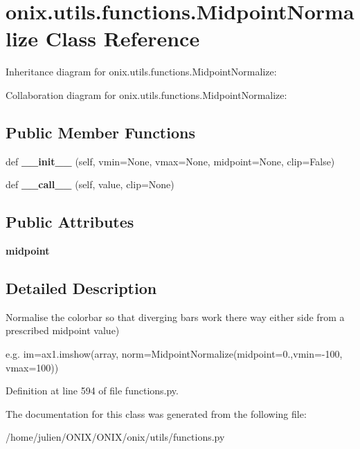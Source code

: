 \hypertarget{classonix_1_1utils_1_1functions_1_1MidpointNormalize}{}\section{onix.\+utils.\+functions.\+Midpoint\+Normalize Class Reference}
\label{classonix_1_1utils_1_1functions_1_1MidpointNormalize}


Inheritance diagram for onix.\+utils.\+functions.\+Midpoint\+Normalize\+:


Collaboration diagram for onix.\+utils.\+functions.\+Midpoint\+Normalize\+:
\subsection*{Public Member Functions}
\begin{DoxyCompactItemize}
\item 
\mbox{\label{classonix_1_1utils_1_1functions_1_1MidpointNormalize_a3a2aabe3adde734ddd54a51035d1ed73}} 
def {\bfseries \+\_\+\+\_\+init\+\_\+\+\_\+} (self, vmin=None, vmax=None, midpoint=None, clip=False)
\item 
\mbox{\label{classonix_1_1utils_1_1functions_1_1MidpointNormalize_ab3622ca6d45aebe46dd0ac8826dc38e3}} 
def {\bfseries \+\_\+\+\_\+call\+\_\+\+\_\+} (self, value, clip=None)
\end{DoxyCompactItemize}
\subsection*{Public Attributes}
\begin{DoxyCompactItemize}
\item 
\mbox{\label{classonix_1_1utils_1_1functions_1_1MidpointNormalize_a63b5eba335b4bb1a311c211a6a9dba4d}} 
{\bfseries midpoint}
\end{DoxyCompactItemize}


\subsection{Detailed Description}
\begin{DoxyVerb}Normalise the colorbar so that diverging bars work there way either side from a prescribed midpoint value)

e.g. im=ax1.imshow(array, norm=MidpointNormalize(midpoint=0.,vmin=-100, vmax=100))
\end{DoxyVerb}
 

Definition at line 594 of file functions.\+py.



The documentation for this class was generated from the following file\+:\begin{DoxyCompactItemize}
\item 
/home/julien/\+O\+N\+I\+X/\+O\+N\+I\+X/onix/utils/functions.\+py\end{DoxyCompactItemize}
